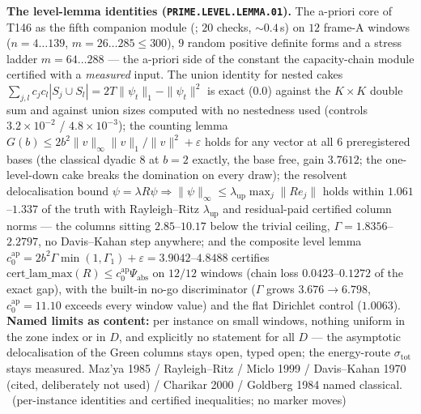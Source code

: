 \par\smallskip\noindent\textbf{The level-lemma identities
(\texttt{PRIME.LEVEL.LEMMA.01}).}
The a-priori core of T146 as the fifth companion module
(; $20$ checks, ${\sim}0.4$\,s) on $12$
frame-A windows ($n=4\ldots139$, $m=26\ldots285\le300$), $9$ random positive
definite forms and a stress ladder $m=64\ldots288$ --- the a-priori side of the
constant the capacity-chain module certified with a \emph{measured} input. The
union identity for nested cakes
$\sum_{j,l}c_jc_l|S_j\cup S_l|=2T\|\psi_t\|_1-\|\psi_t\|^2$ is exact ($0.0$)
against the $K\times K$ double sum and against union sizes computed with no
nestedness used (controls $3.2\times10^{-2}$ / $4.8\times10^{-3}$); the
counting lemma $G(b)\le2b^2\|v\|_\infty\|v\|_1/\|v\|^2+\varepsilon$ holds for
any vector at all $6$ preregistered bases (the classical dyadic $8$ at $b=2$
exactly, the base free, gain $3.7612$; the one-level-down cake breaks the
domination on every draw); the resolvent delocalisation bound
$\psi=\lambda R\psi\Rightarrow\|\psi\|_\infty\le\lambda_{\mathrm{up}}
\max_j\|Re_j\|$ holds within $1.061$--$1.337$ of the truth with Rayleigh--Ritz
$\lambda_{\mathrm{up}}$ and residual-paid certified column norms --- the
columns sitting $2.85$--$10.17$ below the trivial ceiling, $\Gamma=1.8356$--
$2.2797$, no Davis--Kahan step anywhere; and the composite level lemma
$c_0^{\mathrm{ap}}=2b^2\Gamma\min(1,\Gamma_1)+\varepsilon=3.9042$--$4.8488$
certifies $\mathrm{cert\_lam\_max}(R)\le c_0^{\mathrm{ap}}\Psi_{\mathrm{abs}}$
on $12/12$ windows (chain loss $0.0423$--$0.1272$ of the exact gap), with the
built-in no-go discriminator ($\Gamma$ grows $3.676\to6.798$,
$c_0^{\mathrm{ap}}=11.10$ exceeds every window value) and the flat Dirichlet
control ($1.0063$).
\textbf{Named limits as content:} per instance on small windows, nothing
uniform in the zone index or in $D$, and explicitly no statement for all $D$
--- the asymptotic delocalisation of the Green columns stays open, typed open;
the energy-route $\sigma_{\mathrm{tot}}$ stays measured. Maz'ya 1985 /
Rayleigh--Ritz / Miclo 1999 / Davis--Kahan 1970 (cited, deliberately not used)
/ Charikar 2000 / Goldberg 1984 named classical.
\mE\ (per-instance identities and certified inequalities; no marker moves)
\par\smallskip


